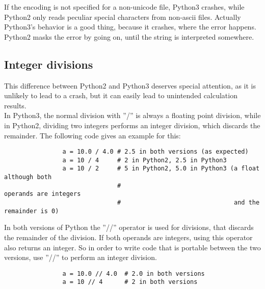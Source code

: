 			If the encoding is not specified for a non-unicode file, Python3 crashes, while Python2 only reads peculiar special characters from non-ascii files.
			Actually Python3's behavior is a good thing, because it crashes, where the error happens.
			Python2 masks the error by going on, until the string is interpreted somewhere.

		\subsection{Integer divisions}
			This difference between Python2 and Python3 deserves special attention, as it is unlikely to lead to a crash, but it can easily lead to unintended calculation results.\\
			In Python3, the normal division with ''/'' is always a floating point division, while in Python2, dividing two integers performs an integer division, which discards the remainder.
			The following code gives an example for this:
			\begin{verbatim}
				a = 10.0 / 4.0 # 2.5 in both versions (as expected)
				a = 10 / 4     # 2 in Python2, 2.5 in Python3
				a = 10 / 2     # 5 in Python2, 5.0 in Python3 (a float although both
				               #                               operands are integers
				               #                               and the remainder is 0)
			\end{verbatim}

			In both versions of Python the ''//'' operator is used for divisions, that discards the remainder of the division.
			If both operands are integers, using this operator also returns an integer.
			So in order to write code that is portable between the two versions, use ''//'' to perform an integer division.
			\begin{verbatim}
				a = 10.0 // 4.0  # 2.0 in both versions
				a = 10 // 4      # 2 in both versions
			\end{verbatim}



